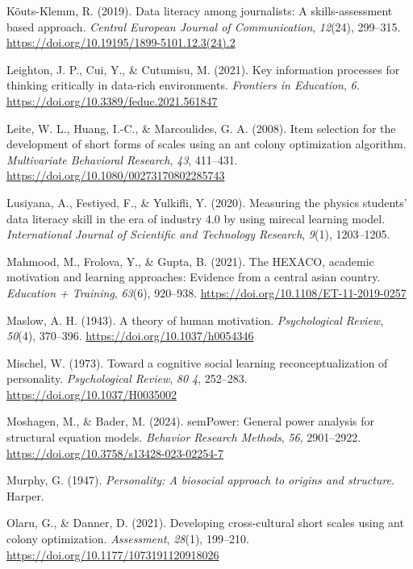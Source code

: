 \documentclass[
  12pt,
  a4paper,
  twoside]{article}
\newlength{\cslhangindent}
\newenvironment{CSLReferences}[2] %
 {\begin{list}{}{%
  \setlength{\itemindent}{0pt}
  \setlength{\leftmargin}{0pt}
  \setlength{\parsep}{0pt}
  \ifodd #1
   \setlength{\leftmargin}{\cslhangindent}
   \setlength{\itemindent}{-1\cslhangindent}
  \fi
  \setlength{\itemsep}{#2\baselineskip}}}
 {\end{list}}
\begin{document}
\begin{CSLReferences}{1}{0}
Kõuts-Klemm, R. (2019). Data literacy among journalists: A skills-assessment based approach. \emph{Central European Journal of Communication}, \emph{12}(24), 299--315. \url{https://doi.org/10.19195/1899-5101.12.3(24).2}

Leighton, J. P., Cui, Y., \& Cutumisu, M. (2021). Key information processes for thinking critically in data-rich environments. \emph{Frontiers in Education}, \emph{6}. \url{https://doi.org/10.3389/feduc.2021.561847}

Leite, W. L., Huang, I.-C., \& Marcoulides, G. A. (2008). Item selection for the development of short forms of scales using an ant colony optimization algorithm. \emph{Multivariate Behavioral Research}, \emph{43}, 411--431. \url{https://doi.org/10.1080/00273170802285743}

Lusiyana, A., Festiyed, F., \& Yulkifli, Y. (2020). Measuring the physics students' data literacy skill in the era of industry 4.0 by using mirecal learning model. \emph{International Journal of Scientific and Technology Research}, \emph{9}(1), 1203--1205.

Mahmood, M., Frolova, Y., \& Gupta, B. (2021). The HEXACO, academic motivation and learning approaches: Evidence from a central asian country. \emph{Education + Training}, \emph{63}(6), 920--938. \url{https://doi.org/10.1108/ET-11-2019-0257}

Maslow, A. H. (1943). A theory of human motivation. \emph{Psychological Review}, \emph{50}(4), 370--396. \url{https://doi.org/10.1037/h0054346}

Mischel, W. (1973). Toward a cognitive social learning reconceptualization of personality. \emph{Psychological Review}, \emph{80 4}, 252--283. \url{https://doi.org/10.1037/H0035002}

Moshagen, M., \& Bader, M. (2024). semPower: General power analysis for structural equation models. \emph{Behavior Research Methods}, \emph{56}, 2901--2922. \url{https://doi.org/10.3758/s13428-023-02254-7}

Murphy, G. (1947). \emph{Personality: A biosocial approach to origins and structure}. Harper.

Olaru, G., \& Danner, D. (2021). Developing cross-cultural short scales using ant colony optimization. \emph{Assessment}, \emph{28}(1), 199--210. \url{https://doi.org/10.1177/1073191120918026}


\end{CSLReferences}
\end{document}

